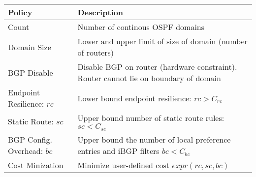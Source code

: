 \begin{table}[!t]
\begin{small}
	\begin{center}
		\begin{tabular}{m{6.5em}  m{17.7em} } 
			{\bf Policy} & {\bf Description} \\ 
			\hline
			Count & Number of continous OSPF domains  \\ \hline
			Domain Size  & Lower and upper
			limit of size of domain (number of routers) \\ \hline
			BGP \newline Disable & Disable BGP on router (hardware constraint). 
			Router cannot lie on boundary of domain \\ \hline
			Endpoint \newline Resilience: $rc$ & Lower bound endpoint resilience: \newline
			$rc > C_{rc}$\\ \hline
			Static Route: ${sc}$ & Upper bound number of static route rules: $sc < C_{sc}$ \\ \hline
			BGP Config. Overhead: $bc$ & Upper bound the number of local preference entries and iBGP filters $bc < C_{bc}$ \\ \hline
			Cost Minization & Minimize user-defined cost $expr(rc, sc, bc)$
		\end{tabular}
	\end{center}
	 \label{tab:configpolicysupport} 
\end{small}
\end{table}

